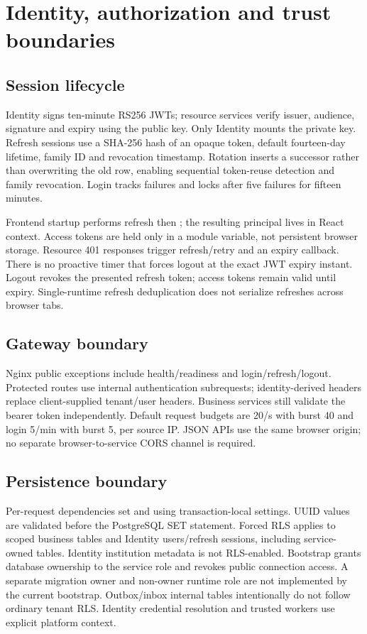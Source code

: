 \documentclass[10pt,a4paper]{article}
\begin{document}
\clearpage
\section{Identity, authorization and trust boundaries}
\subsection{Session lifecycle}
Identity signs ten-minute RS256 JWTs; resource services verify issuer, audience,
signature and expiry using the public key. Only Identity mounts the private key.
Refresh sessions use a SHA-256 hash of an opaque token, default fourteen-day lifetime,
family ID and revocation timestamp. Rotation inserts a successor rather than
overwriting the old row, enabling sequential token-reuse detection and family revocation.
Login tracks failures and locks after five failures for fifteen minutes.

Frontend startup performs refresh then ; the resulting principal lives
in React context. Access tokens are held only in a module variable, not persistent
browser storage. Resource 401 responses trigger refresh/retry and an expiry callback.
There is no proactive timer that forces logout at the exact JWT expiry instant.
Logout revokes the presented refresh token; access tokens remain valid until expiry.
Single-runtime refresh deduplication does not serialize refreshes across browser tabs.

\subsection{Gateway boundary}
Nginx public exceptions include health/readiness and login/refresh/logout.
Protected routes use internal  authentication subrequests;
identity-derived headers replace client-supplied tenant/user headers.
Business services still validate the bearer token independently. Default request
budgets are 20/s with burst 40 and login 5/min with burst 5, per source IP.
JSON APIs use the same browser origin; no separate browser-to-service CORS channel
is required.

\subsection{Persistence boundary}
Per-request dependencies set  and
 using transaction-local settings. UUID values are
validated before the PostgreSQL SET statement. Forced RLS applies to scoped business
tables and Identity users/refresh sessions, including service-owned tables.
Identity institution metadata is not RLS-enabled. Bootstrap grants database ownership
to the service role and revokes public connection access. A separate migration owner
and non-owner runtime role are not implemented by the current bootstrap.
Outbox/inbox internal tables intentionally do not follow ordinary tenant RLS.
Identity credential resolution and trusted workers use explicit platform context.
\end{document}
